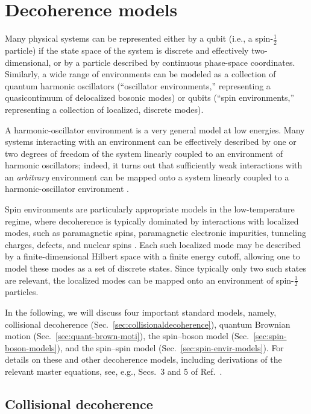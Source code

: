 \documentclass[3p,sort&compress,12pt]{elsarticle}
\begin{document}
\section{\label{sec:decmodels}Decoherence models}

Many physical systems can be represented either by a qubit (i.e., a spin-$\frac{1}{2}$ particle) if the state space of the system is discrete and effectively two-dimensional, or by a particle described by continuous phase-space coordinates. Similarly, a wide range of environments can be modeled as a collection of quantum harmonic oscillators (``oscillator environments,'' representing a quasicontinuum of delocalized bosonic modes) or qubits (``spin environments,'' representing a collection of localized, discrete modes). 

A harmonic-oscillator environment is a very general model at low energies. Many systems interacting with an environment can be effectively described by one or two degrees of freedom of the system linearly coupled to an environment of harmonic oscillators; indeed, it turns out that sufficiently weak interactions with an \emph{arbitrary} environment can be mapped onto a system linearly coupled to a harmonic-oscillator environment \cite{Feynman:1963:jj,Caldeira:1983:gv}.

Spin environments are particularly appropriate models in the low-temperature regime, where decoherence is typically dominated by interactions with localized modes, such as paramagnetic spins, paramagnetic electronic impurities, tunneling charges, defects, and nuclear spins \cite{Dube:2001:zz,Prokofev:2000:zz,Lounasmaa:1974:yb}. Each such localized mode may be described by a finite-dimensional Hilbert space with a finite energy cutoff, allowing one to model these modes as a set of discrete states. Since typically only two such states are relevant, the localized modes can be mapped onto an environment of spin-$\frac{1}{2}$ particles.

In the following, we will discuss four important standard models, namely, collisional decoherence (Sec.~\ref{sec:collisionaldecoherence}), quantum Brownian motion (Sec.~\ref{sec:quant-brown-moti}), the spin--boson model (Sec.~\ref{sec:spin-boson-models}), and the spin--spin model (Sec.~\ref{sec:spin-envir-models}). For details on these and other decoherence models, including derivations of the relevant master equations, see, e.g., Secs.~3 and 5 of Ref.~\cite{Schlosshauer:2007:un}. 

\subsection{\label{sec:collisionaldecoherence}Collisional decoherence}
\end{document}
